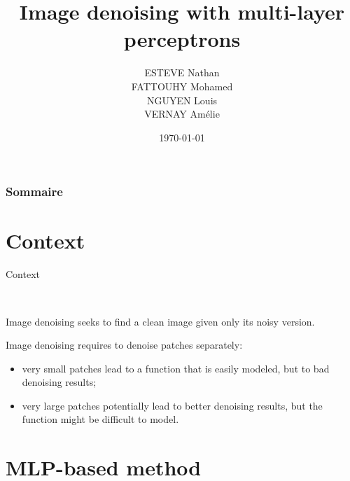 \documentclass[8pt]{beamer}
\title{Image denoising with multi-layer perceptrons}
\author{ESTEVE Nathan \\ FATTOUHY Mohamed \\ NGUYEN Louis\\ VERNAY Amélie}
\date{\today}
\begin{document}
\begin{frame}
\titlepage
\end{frame}




\begin{frame}
\frametitle{Sommaire}
\tableofcontents
\end{frame}


\section{Context}

\begin{frame}{Context}
\begin{mybox}
\end{mybox}\



\begin{mybox}
Image denoising seeks to find a clean image given only its noisy version.

\end{mybox}

\begin{mybox}
Image denoising requires to denoise patches separately:

\begin{itemize}
\item very small patches lead to a function that is easily modeled, but to bad denoising results;
\item very large patches potentially lead to better denoising results, but the function might be difficult to model.
\end{itemize}

\end{mybox}


\end{frame}

\section{MLP-based method}
\end{document}
